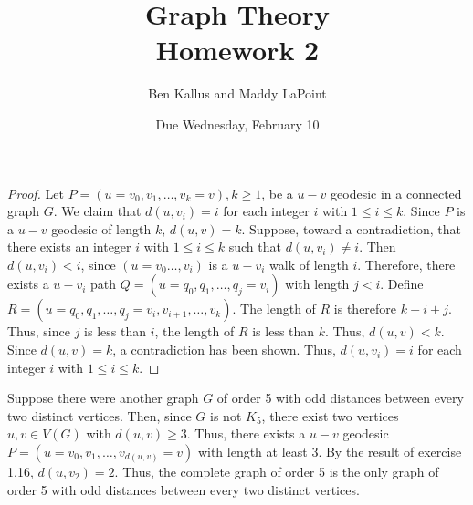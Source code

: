 \documentclass[12pt]{article}
\title{Graph Theory \\ Homework 2}
\author{Ben Kallus and Maddy LaPoint}
\date{Due Wednesday, February 10}
\begin{document}
\pagecolor{black}
\color{white}
\maketitle

\begin{proof}
    Let $P = (u = v_0, v_1, \hdots, v_k = v), k \geq 1$, be a $u-v$ geodesic in a connected graph $G$.
    We claim that $d(u,v_i)=i$ for each integer $i$ with $1 \leq i \leq k$.
    Since $P$ is a $u-v$ geodesic of length $k$, $d(u,v)=k$.
    Suppose, toward a contradiction, that there exists an integer $i$ with $1 \leq i \leq k$ such that $d(u,v_i) \neq i$.
    Then $d(u,v_i) < i$, since $(u = v_0 \hdots, v_i)$ is a $u-v_i$ walk of length $i$.
    Therefore, there exists a $u-v_i$ path $Q = (u=q_0, q_1, \hdots, q_j=v_i)$ with length $j < i$.
    Define $R = (u=q_0, q_1, \hdots, q_j=v_i, v_{i+1}, \hdots, v_k)$.
    The length of $R$ is therefore $k - i + j$.
    Thus, since $j$ is less than $i$, the length of $R$ is less than $k$.
    Thus, $d(u,v) < k$.
    Since $d(u,v)=k$, a contradiction has been shown.
    Thus, $d(u,v_i)=i$ for each integer $i$ with $1 \leq i \leq k$.
\end{proof}

\bigskip
{}
\begin{center}
\end{center}

    Suppose there were another graph $G$ of order 5 with odd distances between every two distinct vertices.
    Then, since $G$ is not $K_5$, there exist two vertices $u,v \in V(G)$ with $d(u,v) \geq 3$.
    Thus, there exists a $u-v$ geodesic $P = (u=v_0, v_1, \hdots, v_{d(u,v)}=v)$ with length at least 3.
    By the result of exercise 1.16, $d(u,v_2) = 2$.
    Thus, the complete graph of order 5 is the only graph of order 5 with odd distances between every two distinct vertices.

\newpage
{}
\end{document}
